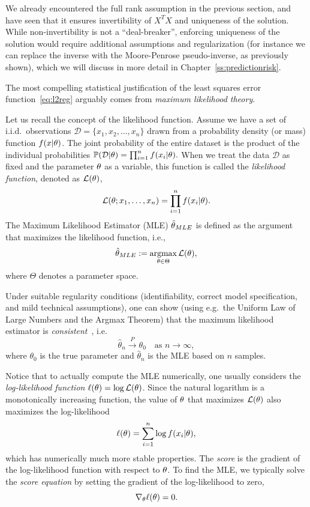 We already encountered the full rank assumption in the previous section, and have seen that it ensures invertibility of $X^T X$ and uniqueness of the solution. While non-invertibility is not a ``deal-breaker'', enforcing uniqueness of the solution would require additional assumptions and regularization (for instance we can replace the inverse with the Moore-Penrose pseudo-inverse, as previously shown), which we will discuss in more detail in Chapter~\ref{ss:predictionrisk}.

\medskip
The most compelling statistical justification of the least squares error function~\eqref{eq:l2reg} arguably comes from {\em maximum likelihood theory}. 

Let us recall the concept of the likelihood function.
Assume we have a set of i.i.d.\ observations $\mathcal{D} = \{x_1, x_2, \dots, x_n\}$ drawn from a probability density (or mass) function $f(x | \theta)$. The joint probability of the entire dataset is the product of the individual probabilities
$\mathbb{P}(\mathcal{D} | \theta) = \prod_{i=1}^n f(x_i | \theta).$
When we treat the data $\mathcal{D}$ as fixed and the parameter $\theta$ as a variable, this function is called the {\em likelihood function}, denoted as $\mathcal{L}(\theta)$,
$$\mathcal{L}(\theta; x_1, \dots, x_n) = \prod_{i=1}^n f(x_i | \theta).$$
The Maximum Likelihood Estimator (MLE) $\hat{\theta}_{MLE}$ is defined as the argument that maximizes the likelihood function, i.e., 
$$\hat{\regpar}_{MLE} := \argmax_{\regpar \in \Theta} \mathcal{L}(\regpar),$$
where $\Theta$ denotes a parameter space.


Under suitable regularity conditions (identifiability, correct model specification, and mild technical assumptions), one can show (using e.g.\ the Uniform Law of Large Numbers and the Argmax Theorem) that the maximum likelihood estimator is {\em consistent}~\cite{wald1949note,van2000asymptotic}, i.e.
$$
\hat{\theta}_n \xrightarrow{P} \theta_0 \quad \text{as } n \to \infty,
$$
where $\theta_0$ is the true parameter and 
$\hat{\theta}_n$ is the  MLE based on $n$ samples.

\smallskip
Notice that to actually compute the MLE numerically, one usually considers the
{\em log-likelihood function} $\ell(\theta) = \log \mathcal{L}(\theta)$.
Since the natural logarithm is a monotonically increasing function, the value of $\theta$ that maximizes $\mathcal{L}(\theta)$ also maximizes the log-likelihood
$$\ell(\theta) = \sum_{i=1}^n \log f(x_i | \theta),$$
which has numerically much more stable properties.
The {\em score} is the gradient of the log-likelihood function with respect to $\theta$.
To find the MLE, we typically solve the {\em score equation} by setting the gradient of the log-likelihood to zero,
$$\nabla_\theta \ell(\theta) = 0.$$





